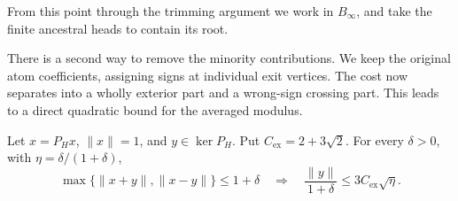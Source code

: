 From this point through the trimming argument we work in $B_\infty$,
and take the finite ancestral heads to contain its root.

There is a second way to remove the minority contributions. We keep
the original atom coefficients, assigning signs at individual exit
vertices. The cost now separates into a wholly exterior part and a
wrong-sign crossing part. This leads to a direct quadratic bound for
the averaged modulus.

\begin{proposition}\label{stab:sign:exit-lens}
Let $x=P_Hx$, $\|x\|=1$, and $y\in\ker P_H$. Put
$C_{\mathrm{ex}}=2+3\sqrt2$. For every $\delta>0$, with
$\eta=\delta/(1+\delta)$,
\begin{equation}\label{stab:sign:exit-lens-bound}
 \max\{\|x+y\|,\|x-y\|\}\le1+\delta
 \quad\Longrightarrow\quad
 \frac{\|y\|}{1+\delta}\le3C_{\mathrm{ex}}\sqrt\eta.
\end{equation}
\end{proposition}


